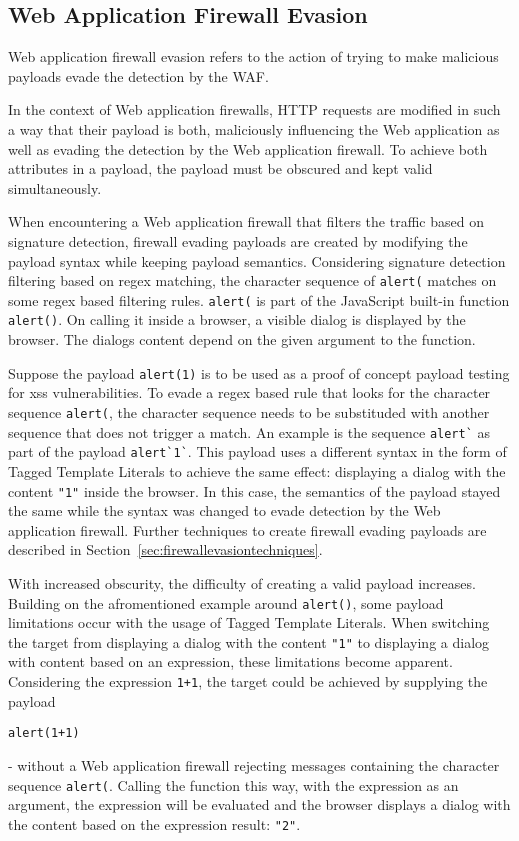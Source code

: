 \subsection{Web Application Firewall Evasion}
Web application firewall evasion refers to the action of trying to make malicious payloads evade the detection by the WAF.

In the context of Web application firewalls, HTTP requests are modified in such a way that their payload is both, maliciously influencing the Web application as well as evading the detection by the Web application firewall. To achieve both attributes in a payload, the payload must be obscured and kept valid simultaneously. 

When encountering a Web application firewall that filters the traffic based on signature detection, firewall evading payloads are created by modifying the payload syntax while keeping payload semantics. Considering signature detection filtering based on regex matching, the character sequence of \verb|alert(| matches on some regex based filtering rules. \verb|alert(| is part of the JavaScript built-in function \verb|alert()|. On calling it inside a browser, a visible dialog is displayed by the browser. The dialogs content depend on the given argument to the function. 

Suppose the payload \verb|alert(1)| is to be used as a proof of concept payload testing for \gls{xss} vulnerabilities.
To evade a regex based rule that looks for the character sequence \verb|alert(|, the character sequence needs to be substituded with another sequence that does not trigger a match. An example is the sequence \verb|alert`| as part of the payload \verb|alert`1`|. This payload uses a different syntax in the form of Tagged Template Literals to achieve the same effect: displaying a dialog with the content \verb|"1"| inside the browser.
In this case, the semantics of the payload stayed the same while the syntax was changed to evade detection by the Web application firewall.
Further techniques to create firewall evading payloads are described in Section~\ref{sec:firewallevasiontechniques}.

With increased obscurity, the difficulty of creating a valid payload increases. Building on the afromentioned example around \verb|alert()|, some payload limitations occur with the usage of Tagged Template Literals. When switching the target from displaying a dialog with the content \verb|"1"| to displaying a dialog with content based on an expression, these limitations become apparent. Considering the expression \verb|1+1|, the target could be achieved by supplying the payload
\begin{lstlisting}[style=basicStyle]
alert(1+1)
\end{lstlisting}
- without a Web application firewall rejecting messages containing the character sequence \verb|alert(|. Calling the function this way, with the expression as an argument, the expression will be evaluated and the browser displays a dialog with the content based on the expression result: \verb|"2"|.

